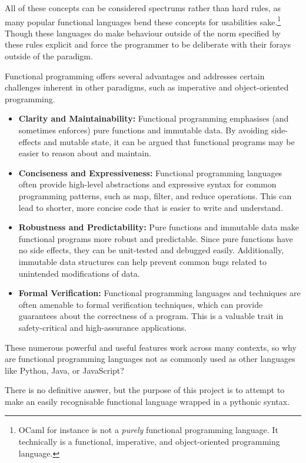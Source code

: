 \documentclass{l4proj}
\begin{document}
All of these concepts can be considered spectrums rather than hard rules, as many popular functional languages bend these concepts for usabilities sake.\footnote{OCaml for instance is not a \emph{purely} functional programming language. It technically is a functional, imperative, and object-oriented programming language.}
Though these languages do make behaviour outside of the norm specified by these rules explicit and force the programmer to be deliberate with their forays outside of the paradigm.

Functional programming offers several advantages and addresses certain challenges inherent in other paradigms, such as imperative and object-oriented programming. 

\begin{itemize}
    \item \textbf{Clarity and Maintainability:} Functional programming emphasises (and sometimes enforces) pure functions and immutable data.
    By avoiding side-effects and mutable state, it can be argued that functional programs may be easier to reason about and maintain.
    \item \textbf{Conciseness and Expressiveness:} Functional programming languages often provide high-level abstractions and expressive syntax for common programming patterns, such as map, filter, and reduce operations.
    This can lead to shorter, more concise code that is easier to write and understand.
    \item \textbf{Robustness and Predictability:} Pure functions and immutable data make functional programs more robust and predictable.
    Since pure functions have no side effects, they can be unit-tested and debugged easily.
    Additionally, immutable data structures can help prevent common bugs related to unintended modifications of data.
    \item \textbf{Formal Verification:} Functional programming languages and techniques are often amenable to formal verification techniques, which can provide guarantees about the correctness of a program.
    This is a valuable trait in safety-critical and high-assurance applications.
\end{itemize}

These numerous powerful and useful features work across many contexts, so why are functional programming languages not as commonly used as other languages like Python, Java, or JavaScript?

There is no definitive answer, but the purpose of this project is to attempt to make an easily recognisable functional language wrapped in a pythonic syntax.
\end{document}
